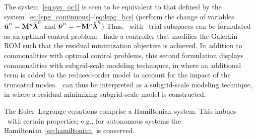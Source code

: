 The system~\eqref{eq:sys_oc1} is seen to be equivalent to that defined by the system~\eqref{eq:lspg_continuous}--\eqref{eq:lspg_bcs} (perform 
the change of variables ${\hat{\boldsymbol u}^{n}} = \mathbf{M}^{n} \hat{\boldsymbol \lambda}^{n}$ and $\hat{\boldsymbol \nu}^{n} = -\mathbf{M}^{n} \hat{\boldsymbol \lambda}^{n}$) 
Thus, \methodAcronym\ with \spatialAcronym\ trial subspaces can be formulated as an optimal control problem: \methodAcronym\ finds a controller that modifies the Galerkin ROM such that the residual minimization objective is achieved. In addition to commonalities with optimal control problems, this second formulation displays commonalities with subgrid-scale modeling techniques, in where an additional term is added to the reduced-order model to account for the impact of the truncated modes. \methodAcronym\ can thus be interpreted as a subgrid-scale modeling technique, in where a residual minimizing subgrid-scale model is constructed.

\begin{remark}
The Euler--Lagrange equations comprise a Hamiltonian system. This imbues \methodAcronym\ with certain properties; e.g., for autonomous systems the Hamiltonian~\eqref{eq:hamiltonian} is conserved. 
\end{remark} 

